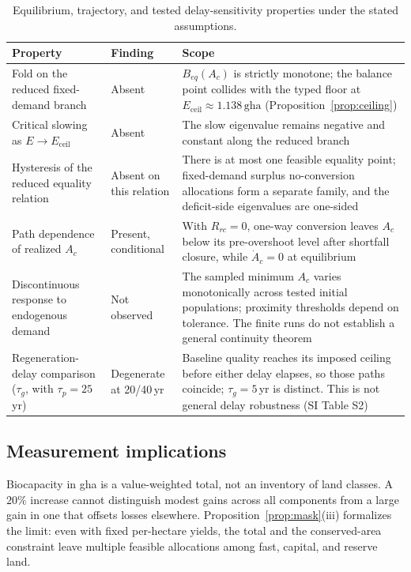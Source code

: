 \documentclass[preprint,12pt,authoryear]{elsarticle}
\newcommand{\Eceil}{E_{\mathrm{ceil}}}
\begin{document}
\begin{table}[!htbp]
\centering\footnotesize
\caption{Equilibrium, trajectory, and tested delay-sensitivity properties under the stated assumptions.}
\label{tab:neg}
\begin{tabularx}{\textwidth}{>{\raggedright\arraybackslash}p{} l >{\raggedright\arraybackslash}X}
\toprule
Property & Finding & Scope \\
\midrule
Fold on the reduced fixed-demand branch & Absent & $B_{eq}(A_c)$ is strictly monotone; the balance point collides with the typed floor at $\Eceil\approx1.138\,\mathrm{gha}$ (Proposition~\ref{prop:ceiling}) \\
Critical slowing as $E\to\Eceil$ & Absent & The slow eigenvalue remains negative and constant along the reduced branch \\
Hysteresis of the reduced equality relation & Absent on this relation & There is at most one feasible equality point; fixed-demand surplus no-conversion allocations form a separate family, and the deficit-side eigenvalues are one-sided \\
Path dependence of realized $A_c$ & Present, conditional & With $R_{rc}=0$, one-way conversion leaves $A_c$ below its pre-overshoot level after shortfall closure, while $\dot A_c=0$ at equilibrium \\
Discontinuous response to endogenous demand & Not observed & The sampled minimum $A_c$ varies monotonically across tested initial populations; proximity thresholds depend on tolerance. The finite runs do not establish a general continuity theorem \\
Regeneration-delay comparison ($\tau_g$, with $\tau_p=25$\,yr) & Degenerate at 20/40\,yr & Baseline quality reaches its imposed ceiling before either delay elapses, so those paths coincide; $\tau_g=5$\,yr is distinct. This is not general delay robustness (SI Table S2) \\
\bottomrule
\end{tabularx}
\end{table}
\clearpage

\subsection{Measurement implications}

Biocapacity in gha is a value-weighted total, not an inventory of land classes. A $20\%$ increase cannot distinguish modest gains across all components from a large gain in one that offsets losses elsewhere. Proposition~\ref{prop:mask}(iii) formalizes the limit: even with fixed per-hectare yields, the total and the conserved-area constraint leave multiple feasible allocations among fast, capital, and reserve land.
\end{document}
